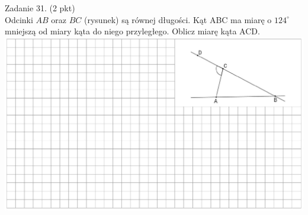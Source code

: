 \documentclass[10pt]{article}
\begin{document}
Zadanie 31. (2 pkt)\\
Odcinki \(A B\) oraz \(B C\) (rysunek) są równej długości. Kąt ABC ma miarę o \(124^{\circ}\) mniejszą od miary kąta do niego przyległego. Oblicz miarę kąta ACD.\\
\includegraphics[max width=\textwidth, center]{2024_11_21_87037534e5fdc524263ag-10}
\end{document}
